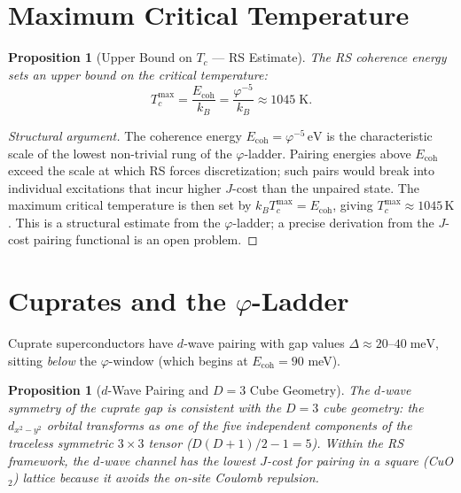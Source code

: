 \documentclass[12pt,a4paper]{article}
\newtheorem{proposition}[theorem]{Proposition}
\theoremstyle{definition}
\theoremstyle{remark}
\begin{document}
\section{Maximum Critical Temperature}
\label{sec:max-tc}

\begin{proposition}[Upper Bound on $T_c$ --- RS Estimate]
\label{thm:max-tc}
The RS coherence energy sets an upper bound on the critical temperature:
\begin{equation}
  \boxed{T_c^{\max} = \frac{E_{\mathrm{coh}}}{k_B}
  = \frac{\varphi^{-5}}{k_B} \approx 1045\;\mathrm{K}.}
\end{equation}
\end{proposition}

\begin{proof}[Structural argument]
The coherence energy $E_{\mathrm{coh}} = \varphi^{-5}\,\mathrm{eV}$ is
the characteristic scale of the lowest non-trivial rung of the
$\varphi$-ladder.  Pairing energies above $E_{\mathrm{coh}}$ exceed the
scale at which RS forces discretization; such pairs would break into
individual excitations that incur higher $J$-cost than the unpaired
state.  The maximum critical temperature is then set by
$k_B T_c^{\max} = E_{\mathrm{coh}}$, giving $T_c^{\max} \approx 1045\,\mathrm{K}$.
This is a structural estimate from the $\varphi$-ladder; a precise derivation
from the $J$-cost pairing functional is an open problem.
\end{proof}

\section{Cuprates and the $\varphi$-Ladder}
\label{sec:cuprates}

Cuprate superconductors have $d$-wave pairing with gap values
$\Delta \approx 20$--$40\;\mathrm{meV}$, sitting \emph{below}
the $\varphi$-window (which begins at $E_{\mathrm{coh}} = 90$ meV).

\begin{proposition}[$d$-Wave Pairing and $D = 3$ Cube Geometry]
The $d$-wave symmetry of the cuprate gap is consistent with the $D = 3$
cube geometry: the $d_{x^2-y^2}$ orbital transforms as one of the
five independent components of the traceless symmetric
$3 \times 3$ tensor ($D(D+1)/2 - 1 = 5$).  Within the RS framework,
the $d$-wave channel has the lowest $J$-cost for pairing in a
square (CuO$_2$) lattice because it avoids the on-site Coulomb
repulsion.
\end{proposition}
\end{document}
